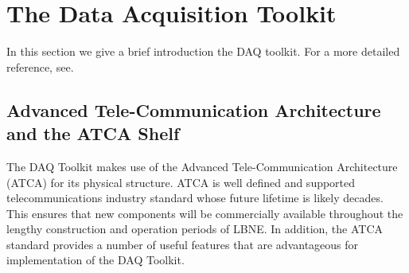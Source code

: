 \section{The Data Acquisition Toolkit}



In this section we give a brief introduction the DAQ toolkit.
For a more detailed reference, see\cite{DAQ_ref}.
\subsection{Advanced Tele-Communication Architecture and the ATCA Shelf}
\label{sec:ATCA}
The DAQ Toolkit makes use of the Advanced Tele-Communication Architecture
(ATCA) for its physical structure.
ATCA is well defined and supported telecommunications industry standard whose 
future lifetime is likely decades.
This ensures that new components will be commercially available throughout the
lengthy construction and operation periods of LBNE.
In addition, the ATCA standard provides a number of useful features that 
are advantageous for implementation of the DAQ Toolkit.

